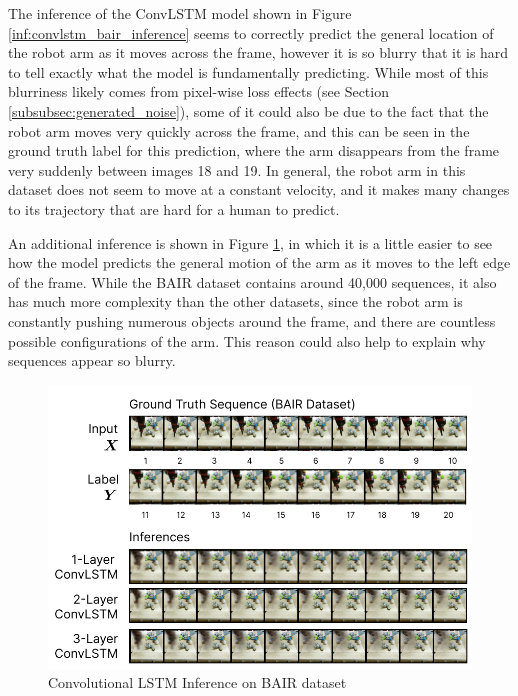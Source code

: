\documentclass{scrartcl}
\begin{document}
The inference of the ConvLSTM model shown in Figure
\ref{inf:convlstm_bair_inference} seems to correctly predict the general location
of the robot arm as it moves across the frame, however it is so blurry that it
is hard to tell exactly what the model is fundamentally predicting. While most
of this blurriness likely comes from pixel-wise loss effects (see Section
\ref{subsubsec:generated_noise}), some of it could also be due to the fact that
the robot arm moves very quickly across the frame, and this can be seen in the
ground truth label for this prediction, where the arm disappears from the frame
very suddenly between images 18 and 19. In general, the robot arm in this
dataset does not seem to move at a constant velocity, and it makes many changes
to its trajectory that are hard for a human to predict.

An additional inference is shown in Figure \ref{inf:convlstm_bair_inference_2},
in which it is a little easier to see how the model predicts the general motion
of the arm as it moves to the left edge of the frame. While the BAIR dataset
contains around 40,000 sequences, it also has much more complexity than the
other datasets, since the robot arm is constantly pushing numerous objects
around the frame, and there are countless possible configurations of the arm.
This reason could also help to explain why sequences appear so blurry.

\begin{figure}[H]
	\begin{center}
		\includegraphics[width=1\textwidth]{inferences/bair/bair_inferences_2.png}
	\end{center}
	\caption{Convolutional LSTM Inference on BAIR dataset}
	\label{inf:convlstm_bair_inference_2}
\end{figure}
\end{document}
